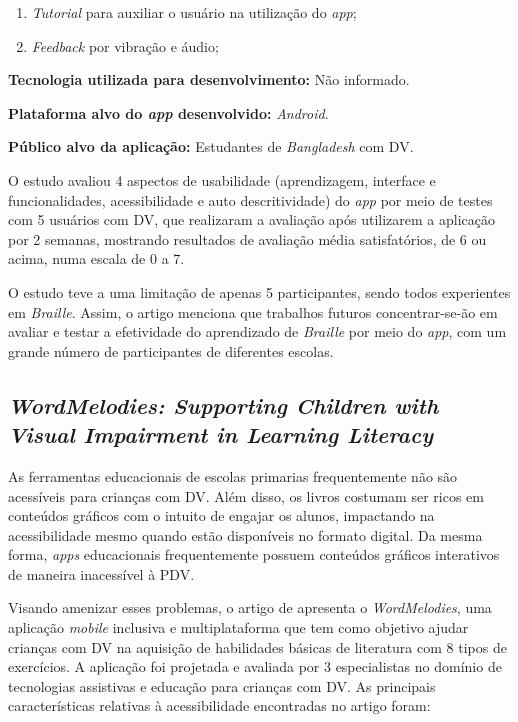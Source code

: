 \begin{enumerate}
    \item \emph{Tutorial} para auxiliar o usuário na utilização do \emph{app};
    \item \emph{Feedback} por vibração e áudio;
\end{enumerate}

\textbf{Tecnologia utilizada para desenvolvimento:} Não informado.

\textbf{Plataforma alvo do \emph{app} desenvolvido:} \emph{Android}.

\textbf{Público alvo da aplicação:} Estudantes de \emph{Bangladesh} com DV\@.

O estudo avaliou 4 aspectos de usabilidade (aprendizagem, interface e funcionalidades, acessibilidade e auto descritividade) do \emph{app} por meio de testes com
5 usuários com DV, que realizaram a avaliação após utilizarem a aplicação por 2 semanas, mostrando resultados de avaliação média satisfatórios, de 6 ou acima, numa escala de 0 a 7.

O estudo teve a uma limitação de apenas 5 participantes, sendo todos experientes em \emph{Braille}.
Assim, o artigo menciona que trabalhos futuros concentrar-se-ão em avaliar e testar a efetividade do aprendizado de \emph{Braille} por meio
do \emph{app}, com um grande número de participantes de diferentes escolas.


\subsection{\emph{WordMelodies: Supporting Children with Visual Impairment in Learning Literacy}}

As ferramentas educacionais de escolas primarias frequentemente não são acessíveis para crianças com DV\@.
Além disso, os livros costumam ser ricos em conteúdos gráficos com o intuito de engajar os alunos, impactando na acessibilidade mesmo quando estão disponíveis no formato digital.
Da mesma forma, \emph{apps} educacionais frequentemente possuem conteúdos gráficos interativos de maneira inacessível à PDV\@.

Visando amenizar esses problemas, o artigo de  apresenta o \emph{WordMelodies}, uma aplicação \emph{mobile}
inclusiva e multiplataforma que tem como objetivo ajudar crianças com DV na aquisição de habilidades básicas de literatura com 8
tipos de exercícios. A aplicação foi projetada e avaliada por 3 especialistas no domínio de tecnologias assistivas e educação
para crianças com DV\@. As principais características relativas à acessibilidade encontradas no artigo foram:

